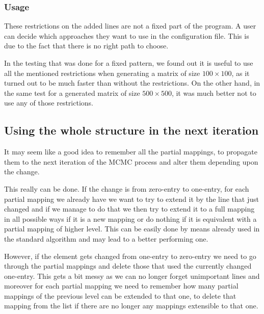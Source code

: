 \subsubsection{Usage}
These restrictions on the added lines are not a fixed part of the program. A user can decide which approaches they want to use in the configuration file. This is due to the fact that there is no right path to choose.

In the testing that was done for a fixed pattern, we found out it is useful to use all the mentioned restrictions when generating a matrix of size $100\times100$, as it turned out to be much faster than without the restrictions. On the other hand, in the same test for a generated matrix of size $500\times500$, it was much better not to use any of those restrictions.

\subsection{Using the whole structure in the next iteration}
It may seem like a good idea to remember all the partial mappings, to propagate them to the next iteration of the MCMC process and alter them depending upon the change.

This really can be done. If the change is from zero-entry to one-entry, for each partial mapping we already have we want to try to extend it by the line that just changed and if we manage to do that we then try to extend it to a full mapping in all possible ways if it is a new mapping or do nothing if it is equivalent with a partial mapping of higher level. This can be easily done by means already used in the standard algorithm and may lead to a better performing one.

However, if the element gets changed from one-entry to zero-entry we need to go through the partial mappings and delete those that used the currently changed one-entry. This gets a bit messy as we can no longer forget unimportant lines and moreover for each partial mapping we need to remember how many partial mappings of the previous level can be extended to that one, to delete that mapping from the list if there are no longer any mappings extensible to that one.

